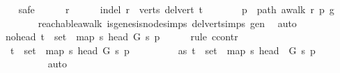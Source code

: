 \begin{isabellebody}
\ \ \isamarkupfalse%
\ safe\isanewline
\ \ \ \ \isamarkupfalse%
\ r\isanewline
\ \ \ \ \isamarkupfalse%
\ in{\isacharunderscore}{\kern0pt}del{\isacharcolon}{\kern0pt}\ {\isachardoublequoteopen}r\ {\isasymin}\ verts\ {\isacharparenleft}{\kern0pt}del{\isacharunderscore}{\kern0pt}vert\ t{\isacharparenright}{\kern0pt}{\isachardoublequoteclose}\isanewline
\ \ \ \ \isamarkupfalse%
\ \isamarkupfalse%
\ p\ \ path{\isacharcolon}{\kern0pt}\ {\isachardoublequoteopen}awalk\ r\ p\ g{\isachardoublequoteclose}\ \isanewline
\ \ \ \ \ \ \isamarkupfalse%
\ reachable{\isacharunderscore}{\kern0pt}awalk\ is{\isacharunderscore}{\kern0pt}genesis{\isacharunderscore}{\kern0pt}node{\isachardot}{\kern0pt}simps\ del{\isacharunderscore}{\kern0pt}vert{\isacharunderscore}{\kern0pt}simps\ gen\ \isamarkupfalse%
\ auto\isanewline
\ \ \ \ \isamarkupfalse%
\ no{\isacharunderscore}{\kern0pt}head{\isacharcolon}{\kern0pt}\ {\isachardoublequoteopen}t\ {\isasymnotin}\ {\isacharparenleft}{\kern0pt}set\ {\isacharparenleft}{\kern0pt}\ map\ {\isacharparenleft}{\kern0pt}{\isasymlambda}s{\isachardot}{\kern0pt}\ {\isacharparenleft}{\kern0pt}head\ G\ s{\isacharparenright}{\kern0pt}{\isacharparenright}{\kern0pt}\ p{\isacharparenright}{\kern0pt}{\isacharparenright}{\kern0pt}{\isachardoublequoteclose}\isanewline
\ \ \ \ \isamarkupfalse%
\ {\isacharparenleft}{\kern0pt}rule\ ccontr{\isacharparenright}{\kern0pt}\isanewline
\ \ \ \ \ \ \isamarkupfalse%
\ {\isachardoublequoteopen}{\isasymnot}\ t\ {\isasymnotin}\ {\isacharparenleft}{\kern0pt}set\ {\isacharparenleft}{\kern0pt}\ map\ {\isacharparenleft}{\kern0pt}{\isasymlambda}s{\isachardot}{\kern0pt}\ {\isacharparenleft}{\kern0pt}head\ G\ s{\isacharparenright}{\kern0pt}{\isacharparenright}{\kern0pt}\ p{\isacharparenright}{\kern0pt}{\isacharparenright}{\kern0pt}{\isachardoublequoteclose}\isanewline
\ \ \ \ \ \ \isamarkupfalse%
\ \isamarkupfalse%
\ as{\isacharcolon}{\kern0pt}\ {\isachardoublequoteopen}t\ {\isasymin}\ {\isacharparenleft}{\kern0pt}set\ {\isacharparenleft}{\kern0pt}\ map\ {\isacharparenleft}{\kern0pt}{\isasymlambda}s{\isachardot}{\kern0pt}\ {\isacharparenleft}{\kern0pt}head\ \ G\ s{\isacharparenright}{\kern0pt}{\isacharparenright}{\kern0pt}\ p{\isacharparenright}{\kern0pt}{\isacharparenright}{\kern0pt}{\isachardoublequoteclose}\isanewline
\ \ \ \ \ \ \ \ \isamarkupfalse%
\ auto\isanewline
\ \ \ \ \ \ \isamarkupfalse%

\end{isabellebody}
